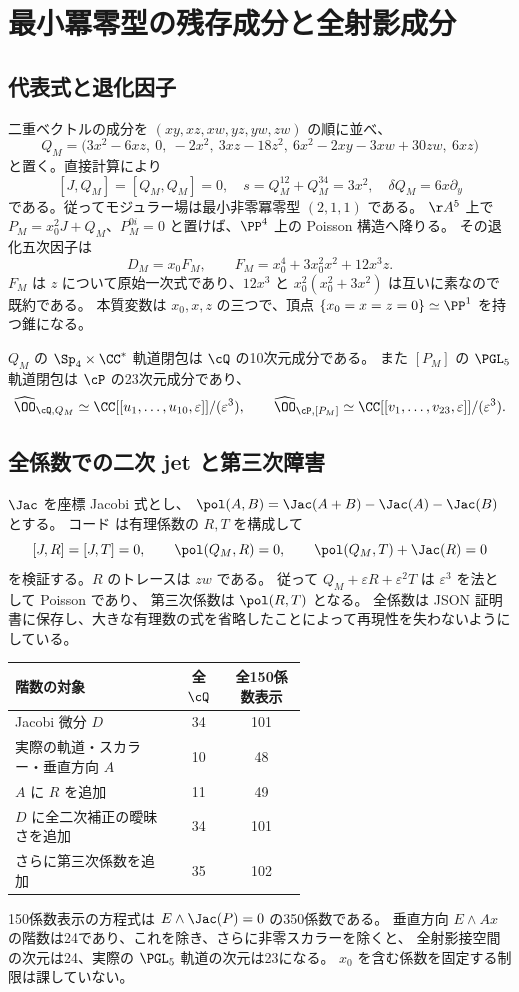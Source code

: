 \section{最小冪零型の残存成分と全射影成分}\label{sec:minimal-v7}
\subsection{代表式と退化因子}
二重ベクトルの成分を $(xy,xz,xw,yz,yw,zw)$ の順に並べ、
\[
 Q_M=\bigl(3x^2-6xz,\ 0,\ -2x^2,\ 3xz-18z^2,
            \ 6x^2-2xy-3xw+30zw,\ 6xz\bigr)
\]
と置く。直接計算により
\[
 [J,Q_M]=[Q_M,Q_M]=0,\quad s=Q_M^{12}+Q_M^{34}=3x^2,
 \quad\delta Q_M=6x\partial_y
\]
である。従ってモジュラー場は最小非零冪零型 $(2,1,1)$ である。
$\AA^5$ 上で $P_M=x_0^2J+Q_M$、$P_M^{0i}=0$ と置けば、$\PP^4$ 上の Poisson 構造へ降りる。
その退化五次因子は
\[
 D_M=x_0F_M,\qquad F_M=x_0^4+3x_0^2x^2+12x^3z.
\]
$F_M$ は $z$ について原始一次式であり、$12x^3$ と $x_0^2(x_0^2+3x^2)$ は互いに素なので既約である。
本質変数は $x_0,x,z$ の三つで、頂点 $\{x_0=x=z=0\}\simeq\PP^1$ を持つ錐になる。

\begin{theorem}\label{thm:minimal-full}
$Q_M$ の $\Sp_4\times\CC^*$ 軌道閉包は $\cQ$ の10次元成分である。
また $[P_M]$ の $\PGL_5$ 軌道閉包は $\cP$ の23次元成分であり、
\[
 \widehat\OO_{\cQ,Q_M}\simeq
 \CC[[u_1,\ldots,u_{10},\varepsilon]]/(\varepsilon^3),
 \qquad
 \widehat\OO_{\cP,[P_M]}\simeq
 \CC[[v_1,\ldots,v_{23},\varepsilon]]/(\varepsilon^3).
\]
\end{theorem}

\subsection{全係数での二次 jet と第三次障害}
$\Jac$ を座標 Jacobi 式とし、
$\pol(A,B)=\Jac(A+B)-\Jac(A)-\Jac(B)$ とする。
コード  は有理係数の $R,T$ を構成して
\[
 [J,R]=[J,T]=0,\qquad
 \pol(Q_M,R)=0,\qquad
 \pol(Q_M,T)+\Jac(R)=0
\]
を検証する。$R$ のトレースは $zw$ である。
従って $Q_M+\varepsilon R+\varepsilon^2T$ は $\varepsilon^3$ を法として Poisson であり、
第三次係数は $\pol(R,T)$ となる。
全係数は JSON 証明書に保存し、大きな有理数の式を省略したことによって再現性を失わないようにしている。

\begin{center}\small
\begin{tabular}{p{0.58\linewidth}cc}
\toprule
階数の対象&全 $\cQ$&全150係数表示\\\midrule
Jacobi 微分 $D$&34&101\\
実際の軌道・スカラー・垂直方向 $A$&10&48\\
$A$ に $R$ を追加&11&49\\
$D$ に全二次補正の曖昧さを追加&34&101\\
さらに第三次係数を追加&35&102\\\bottomrule
\end{tabular}
\end{center}
150係数表示の方程式は $E\wedge\Jac(P)=0$ の350係数である。
垂直方向 $E\wedge Ax$ の階数は24であり、これを除き、さらに非零スカラーを除くと、
全射影接空間の次元は24、実際の $\PGL_5$ 軌道の次元は23になる。
$x_0$ を含む係数を固定する制限は課していない。

